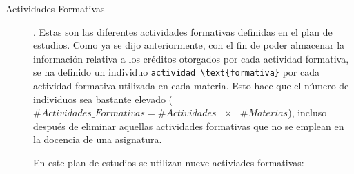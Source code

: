\begin{description}
  
		\item [Actividades Formativas]. Estas son las diferentes actividades formativas definidas en el plan de estudios. Como ya se dijo anteriormente, con el fin de poder almacenar la información relativa a los créditos otorgados por cada actividad formativa, se ha definido un individuo \lstinline$actividad \text{formativa}$ por cada actividad formativa utilizada en cada materia. Esto hace que el número de individuos sea bastante elevado ($\#Actividades\_Formativas=\#Actividades \text{ } \times \text{ } \#Materias$), incluso después de eliminar aquellas actividades formativas que no se emplean en la docencia de una asignatura.
  
  		En este plan de estudios se utilizan nueve activiades formativas:
  

\end{description}

